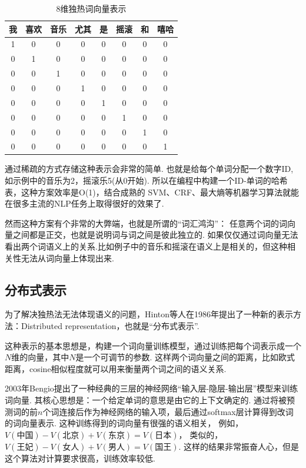 \documentclass[bachelor,adobefonts]{jnuthesis}
\begin{document}
\begin{table}[h!]
  \centering
  \begin{tabular}{cccccccc}
    \toprule
    \textbf{我} & \textbf{喜欢} & \textbf{音乐} & \textbf{尤其} & \textbf{是} & \textbf{摇滚}  & \textbf{和} & \textbf{嘻哈}  \\
    \midrule
    1 & 0 & 0 & 0 & 0 & 0 & 0 & 0 \\
    0 & 1 & 0 & 0 & 0 & 0 & 0 & 0 \\
    0 & 0 & 1 & 0 & 0 & 0 & 0 & 0 \\
    0 & 0 & 0 & 1 & 0 & 0 & 0 & 0 \\
    0 & 0 & 0 & 0 & 1 & 0 & 0 & 0 \\
    0 & 0 & 0 & 0 & 0 & 1 & 0 & 0 \\
    0 & 0 & 0 & 0 & 0 & 0 & 1 & 0 \\
    0 & 0 & 0 & 0 & 0 & 0 & 0 & 1 \\
    \bottomrule
  \end{tabular}
  \caption{8维独热词向量表示}\label{table:3t1}
\end{table}

通过稀疏的方式存储这种表示会非常的简单.
也就是给每个单词分配一个数字ID,如示例中的音乐为2，摇滚乐5(从0开始).
所以在编程中构建一个ID-单词的哈希表，这种方案效率是O(1)，结合成熟的
SVM、CRF、最大熵等机器学习算法就能在很多主流的NLP任务上取得很好的效果了.

然而这种方案有个非常的大弊端，也就是所谓的“词汇鸿沟”：
任意两个词的词向量之间都是正交，也就是说明词与词之间是彼此独立的.
如果仅仅通过词向量无法看出两个词语义上的关系.比如例子中的音乐和摇滚在语义上是相关的，但这种相关性无法从词向量上体现出来.

\subsection{分布式表示}
为了解决独热法无法体现语义的问题，Hinton等人\cite{Rumelhart1986Learning}在1986年提出了一种新的表示方法：Distributed representation，也就是“分布式表示”.

这种表示的基本思想是，构建一个词向量训练模型，通过训练把每个词表示成一个$N$维的向量，其中$N$是一个可调节的参数.
这样两个词向量之间的距离，比如欧式距离，cosine相似程度就可以用来衡量两个词之间的语义关系.

2003年Bengio\cite{Turian2010Word}提出了一种经典的三层的神经网络“输入层-隐层-输出层”模型来训练词向量.
其核心思想是：一个给定单词的意思是由它的上下文确定的.
通过将被预测词的前$n$个词连接后作为神经网络的输入项，最后通过softmax层计算得到改词的词向量表示.
这种训练得到的词向量有很强的语义相关，
例如，$V(\mbox{中国})-V(\mbox{北京})+V(\mbox{东京}) = V(\mbox{日本})$，
类似的，$V(\mbox{王妃})-V(\mbox{女人})+V(\mbox{男人})=V(\mbox{国王})$.
这样的结果非常振奋人心，但是这个算法对计算要求很高，训练效率较低.
\end{document}

